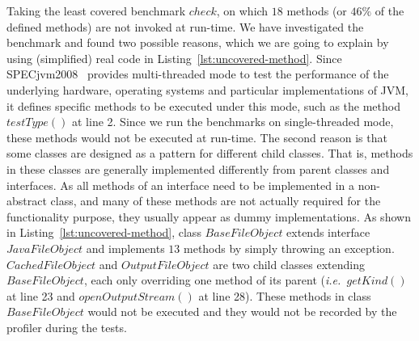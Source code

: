 \documentclass{fac}
\newcommand\ie{\textit{i.e.\ }}
\begin{document}
Taking the least covered benchmark $check$, on which $18$ methods (or $46\%$ of the defined methods) are not invoked at run-time.
We have investigated the benchmark and found two possible reasons, which we are going to explain by using (simplified) real code in Listing~\ref{lst:uncovered-method}.
Since SPECjvm2008~\cite{specjvm} provides multi-threaded mode to test the performance of the underlying hardware, operating systems and particular implementations of JVM, it defines specific methods to be executed under this mode, such as the method $testType()$ at line 2. Since we run the benchmarks on single-threaded mode, these methods would not be executed at run-time. %
The second reason is that some classes are designed as a pattern for different child classes. That is, methods in these classes are generally implemented differently from parent classes and interfaces. As all methods of an interface need to be implemented in a non-abstract class, and many of these methods are not actually required for the functionality purpose, they usually appear as dummy implementations.
As shown in Listing~\ref{lst:uncovered-method}, class $BaseFileObject$ extends interface $JavaFileObject$ and implements $13$ methods by simply throwing an exception. $CachedFileObject$ and $OutputFileObject$ are two child classes extending $BaseFileObject$, %
each only overriding one method of its parent (\ie $getKind()$ at line 23 and $openOutputStream()$ at line 28).
These methods in class $BaseFileObject$ would not be executed and they would not be recorded by the profiler during the tests.
\end{document}
